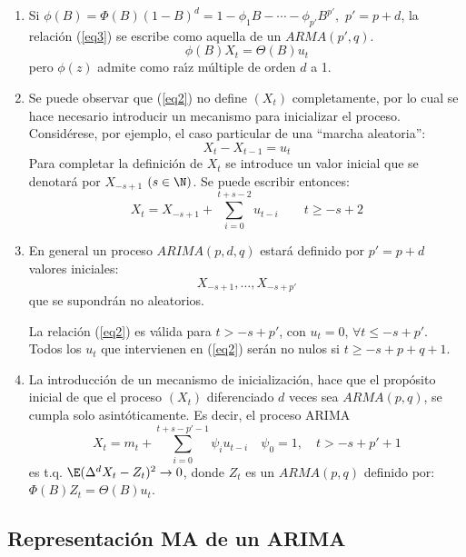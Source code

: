 \begin{observacion}
\quad
\begin{enumerate}
\item Si $\phi (B)=\Phi \left( B \right)(1-B)^{d}=1-\phi_{1} B-\cdots-\phi_{p'} B^{p'},$ $p'=p+d$, la relaci\'{o}n (\ref{eq3}) se escribe como aquella de un $ARMA(p',q)$.
\[
\phi (B)X_{t} =\Theta (B)u_{t} 
\]
pero $\phi (z)$ admite como ra\'{\i}z m\'{u}ltiple de orden $d$ a 1.

\item Se puede observar que (\ref{eq2}) no define $(X_{t})$ completamente, por lo cual se hace necesario introducir un mecanismo para inicializar el proceso. Consid\'{e}rese, por ejemplo, el caso particular de una ``marcha aleatoria'':
\[
X_{t} -X_{t-1} =u_{t} 
\]
Para completar la definici\'{o}n de $X_{t}$ se introduce un valor inicial que se denotar\'{a} por $X_{-s+1}$ $(s\in \N)$. Se puede escribir entonces:
\[
X_{t} =X_{-s+1} +\sum_{i=0}^{t+s-2} {u_{t-i} } 
\qquad
t\ge -s+2
\]

\item En general un proceso $ARIMA(p,d,q)$ estar\'{a} definido por $p'=p+d$ valores iniciales:
\[
X_{-s+1} ,\ldots,X_{-s+p'} 
\]
que se supondr\'{a}n no aleatorios.\newline

La relaci\'{o}n (\ref{eq2}) es v\'{a}lida para $t>-s+p'$, con $u_{t}=0$, $\forall t\le -s+p'$. Todos los $u_{t}$ que intervienen en (\ref{eq2}) ser\'{a}n no nulos si $t\ge - s+p+q+1$.

\item La introducci\'{o}n de un mecanismo de inicializaci\'{o}n, hace que el prop\'{o}sito inicial de que el proceso $(X_{t})$ diferenciado $d$ veces sea $ARMA (p,q)$, se cumpla solo asint\'{o}ticamente. Es decir, el proceso ARIMA
\[
X_{t} =m_{t} +\sum_{i=0}^{t+s-p'-1} {\psi_{i} u_{t-i} } \quad \psi_{0} =1,\quad t>-s+p'+1
\]
es t.q. $\E(\Delta^{d}X_{t} -Z_{t} )^{2}\to 0$, donde $Z_{t} $ es un $ARMA (p,q)$ definido por: $\Phi (B)Z_{t} =\Theta (B)u_{t} $.
\end{enumerate}
\end{observacion}

\subsection{Representaci\'{o}n MA de un ARIMA}

